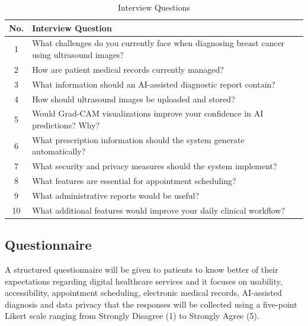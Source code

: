 \documentclass[12pt,a4paper]{report}
\begin{document}
\begin{table}[H]
\centering
\caption{Interview Questions}
\begin{tabular}{|c|p{12cm}|}
\hline
\textbf{No.} & \textbf{Interview Question} \\
\hline
1 & What challenges do you currently face when diagnosing breast cancer using ultrasound images? \\
\hline
2 & How are patient medical records currently managed? \\
\hline
3 & What information should an AI-assisted diagnostic report contain? \\
\hline
4 & How should ultrasound images be uploaded and stored? \\
\hline
5 & Would Grad-CAM visualizations improve your confidence in AI predictions? Why? \\
\hline
6 & What prescription information should the system generate automatically? \\
\hline
7 & What security and privacy measures should the system implement? \\
\hline
8 & What features are essential for appointment scheduling? \\
\hline
9 & What administrative reports would be useful? \\
\hline
10 & What additional features would improve your daily clinical workflow? \\
\hline
\end{tabular}
\end{table}



\subsection{Questionnaire}

A structured questionnaire will be given to patients to know better of their expectations regarding digital healthcare services and it focuses on usability, accessibility, appointment scheduling, electronic medical records, AI-assisted diagnosis and data privacy that the responses will be collected using a five-point Likert scale ranging from Strongly Disagree (1) to Strongly Agree (5).
\end{document}
